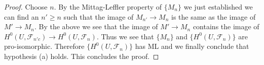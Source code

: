 \begin{proof}
\medskip\noindent
Choose $n$. By the Mittag-Leffler property of $\{M_n\}$ we just established
we can find an $n' \geq n$ such that the image of $M_{n'} \to M_n$
is the same as the image of $M' \to M_n$. By the above we see that
the image of $M' \to M_n$ contains the image of
$H^0(U, \mathcal{F}_{n'c}) \to H^0(U, \mathcal{F}_n)$.
Thus we see that $\{M_n\}$ and $\{H^0(U, \mathcal{F}_n)\}$
are pro-isomorphic. Therefore $\{H^0(U, \mathcal{F}_n)\}$
has ML and we finally conclude that hypothesis (a) holds.
This concludes the proof.
\end{proof}
